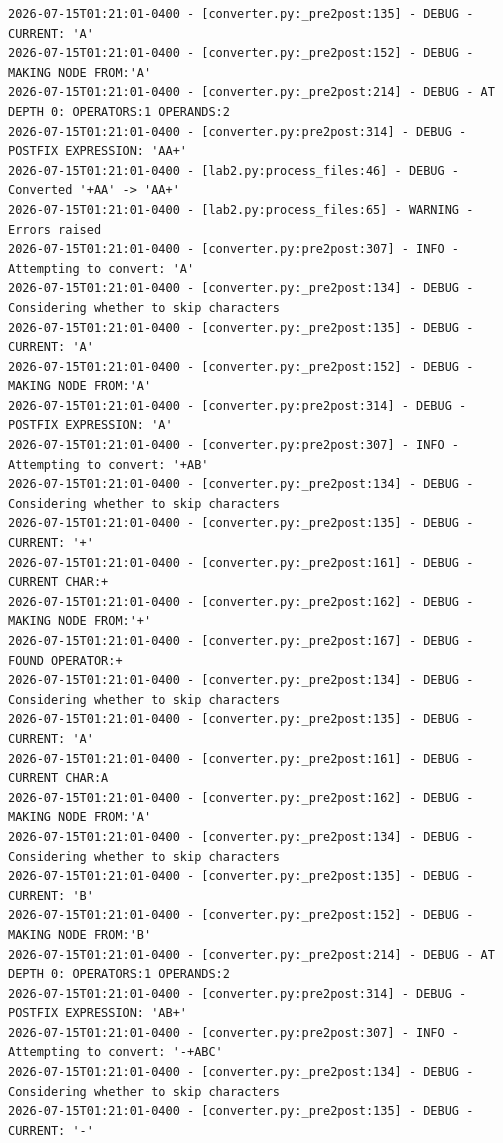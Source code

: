 \documentclass[10pt,letterpaper,final]{report}
\begin{document}
\begin{verbatim}
2026-07-15T01:21:01-0400 - [converter.py:_pre2post:135] - DEBUG - CURRENT: 'A'
2026-07-15T01:21:01-0400 - [converter.py:_pre2post:152] - DEBUG - MAKING NODE FROM:'A'
2026-07-15T01:21:01-0400 - [converter.py:_pre2post:214] - DEBUG - AT DEPTH 0: OPERATORS:1 OPERANDS:2
2026-07-15T01:21:01-0400 - [converter.py:pre2post:314] - DEBUG - POSTFIX EXPRESSION: 'AA+'
2026-07-15T01:21:01-0400 - [lab2.py:process_files:46] - DEBUG - Converted '+AA' -> 'AA+'
2026-07-15T01:21:01-0400 - [lab2.py:process_files:65] - WARNING - Errors raised
2026-07-15T01:21:01-0400 - [converter.py:pre2post:307] - INFO - Attempting to convert: 'A'
2026-07-15T01:21:01-0400 - [converter.py:_pre2post:134] - DEBUG - Considering whether to skip characters
2026-07-15T01:21:01-0400 - [converter.py:_pre2post:135] - DEBUG - CURRENT: 'A'
2026-07-15T01:21:01-0400 - [converter.py:_pre2post:152] - DEBUG - MAKING NODE FROM:'A'
2026-07-15T01:21:01-0400 - [converter.py:pre2post:314] - DEBUG - POSTFIX EXPRESSION: 'A'
2026-07-15T01:21:01-0400 - [converter.py:pre2post:307] - INFO - Attempting to convert: '+AB'
2026-07-15T01:21:01-0400 - [converter.py:_pre2post:134] - DEBUG - Considering whether to skip characters
2026-07-15T01:21:01-0400 - [converter.py:_pre2post:135] - DEBUG - CURRENT: '+'
2026-07-15T01:21:01-0400 - [converter.py:_pre2post:161] - DEBUG - CURRENT CHAR:+
2026-07-15T01:21:01-0400 - [converter.py:_pre2post:162] - DEBUG - MAKING NODE FROM:'+'
2026-07-15T01:21:01-0400 - [converter.py:_pre2post:167] - DEBUG - FOUND OPERATOR:+
2026-07-15T01:21:01-0400 - [converter.py:_pre2post:134] - DEBUG - Considering whether to skip characters
2026-07-15T01:21:01-0400 - [converter.py:_pre2post:135] - DEBUG - CURRENT: 'A'
2026-07-15T01:21:01-0400 - [converter.py:_pre2post:161] - DEBUG - CURRENT CHAR:A
2026-07-15T01:21:01-0400 - [converter.py:_pre2post:162] - DEBUG - MAKING NODE FROM:'A'
2026-07-15T01:21:01-0400 - [converter.py:_pre2post:134] - DEBUG - Considering whether to skip characters
2026-07-15T01:21:01-0400 - [converter.py:_pre2post:135] - DEBUG - CURRENT: 'B'
2026-07-15T01:21:01-0400 - [converter.py:_pre2post:152] - DEBUG - MAKING NODE FROM:'B'
2026-07-15T01:21:01-0400 - [converter.py:_pre2post:214] - DEBUG - AT DEPTH 0: OPERATORS:1 OPERANDS:2
2026-07-15T01:21:01-0400 - [converter.py:pre2post:314] - DEBUG - POSTFIX EXPRESSION: 'AB+'
2026-07-15T01:21:01-0400 - [converter.py:pre2post:307] - INFO - Attempting to convert: '-+ABC'
2026-07-15T01:21:01-0400 - [converter.py:_pre2post:134] - DEBUG - Considering whether to skip characters
2026-07-15T01:21:01-0400 - [converter.py:_pre2post:135] - DEBUG - CURRENT: '-'

\end{verbatim}
\end{document}
